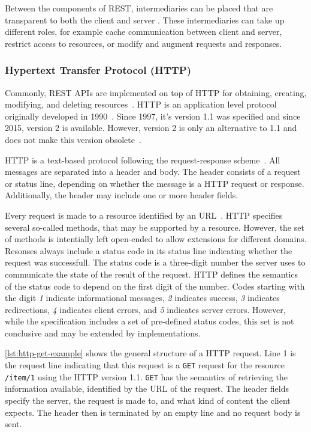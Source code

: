 Between the components of \ac{REST}, intermediaries can be placed that are transparent to both the client and server \cite{Fielding2000}.
These intermediaries can take up different roles, for example cache communication between client and server, restrict access to resources, or modify and augment requests and responses.

\subsubsection{Hypertext Transfer Protocol (\acs{HTTP})}\label{sec:foundations:http}

Commonly, \ac{REST} \acp{API} are implemented on top of \ac{HTTP} for obtaining, creating, modifying, and deleting resources~\cite{Schermann2015}.
\ac{HTTP} is an application level protocol originally developed in 1990~\cite{RFC2068}.
Since 1997, it's version 1.1 was specified and since 2015, version 2 is available.
However, version 2 is only an alternative to 1.1 and does not make this version obsolete~\cite{RFC7540}.

\ac{HTTP} is a text-based protocol following the request-response scheme~\cite{RFC2068}.
All messages are separated into a header and body.
The header consists of a request or status line, depending on whether the message is a \ac{HTTP} request or response.
Additionally, the header may include one or more header fields.

Every request is made to a resource identified by an \ac{URL}~\cite{RFC2068}.
\ac{HTTP} specifies several so-called methods, that may be supported by a resource.
However, the set of methods is intentially left open-ended to allow extensions for different domains.
Resonses always include a status code in its status line indicating whether the request was successfull.
The status code is a three-digit number the server uses to communicate the state of the result of the request.
\ac{HTTP} defines the semantics of the status code to depend on the first digit of the number.
Codes starting with the digit \textit{1} indicate informational messages, \textit{2} indicates success, \textit{3} indicates redirections, \textit{4} indicates client errors, and \textit{5} indicates server errors.
However, while the specification includes a set of pre-defined status codes, this set is not conclusive and may be extended by implementations.

\autoref{lst:http-get-example} shows the general structure of a \ac{HTTP} request.
Line 1 is the request line indicating that this request is a \texttt{GET} request for the resource \texttt{/item/1} using the \ac{HTTP} version 1.1.
\texttt{GET} has the semantics of retrieving the information available, identified by the \ac{URL} of the request.
The header fields specify the server, the request is made to, and what kind of content the client expects.
The header then is terminated by an empty line and no request body is sent.

